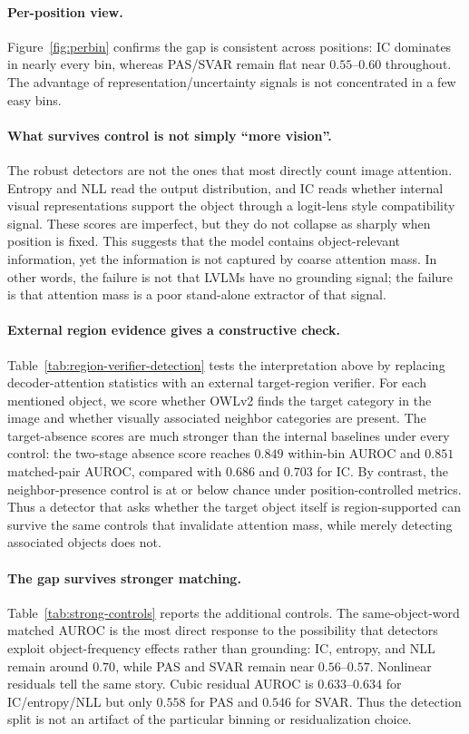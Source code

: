 \paragraph{Per-position view.} Figure~\ref{fig:perbin} confirms the gap is consistent across positions: IC dominates in nearly every bin, whereas PAS/SVAR remain flat near $0.55$--$0.60$ throughout. The advantage of representation/uncertainty signals is not concentrated in a few easy bins.

\paragraph{What survives control is not simply ``more vision''.} The robust detectors are not the ones that most directly count image attention. Entropy and NLL read the output distribution, and IC reads whether internal visual representations support the object through a logit-lens style compatibility signal. These scores are imperfect, but they do not collapse as sharply when position is fixed. This suggests that the model contains object-relevant information, yet the information is not captured by coarse attention mass. In other words, the failure is not that LVLMs have no grounding signal; the failure is that attention mass is a poor stand-alone extractor of that signal.



\paragraph{External region evidence gives a constructive check.} Table~\ref{tab:region-verifier-detection} tests the interpretation above by replacing decoder-attention statistics with an external target-region verifier. For each mentioned object, we score whether OWLv2 \cite{minderer2023scaling} finds the target category in the image and whether visually associated neighbor categories are present. The target-absence scores are much stronger than the internal baselines under every control: the two-stage absence score reaches $0.849$ within-bin AUROC and $0.851$ matched-pair AUROC, compared with $0.686$ and $0.703$ for IC. By contrast, the neighbor-presence control is at or below chance under position-controlled metrics. Thus a detector that asks whether the target object itself is region-supported can survive the same controls that invalidate attention mass, while merely detecting associated objects does not.

\paragraph{The gap survives stronger matching.} Table~\ref{tab:strong-controls} reports the additional controls. The same-object-word matched AUROC is the most direct response to the possibility that detectors exploit object-frequency effects rather than grounding: IC, entropy, and NLL remain around $0.70$, while PAS and SVAR remain near $0.56$--$0.57$. Nonlinear residuals tell the same story. Cubic residual AUROC is $0.633$--$0.634$ for IC/entropy/NLL but only $0.558$ for PAS and $0.546$ for SVAR. Thus the detection split is not an artifact of the particular binning or residualization choice.

